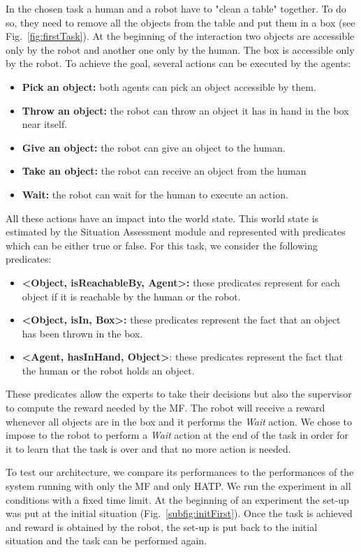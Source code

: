 \documentclass[english,a4paper,11pt,twoside]{StyleThese}
\begin{document}
In the chosen task a human and a robot have to "clean a table" together. To do so, they need to remove all the objects from the table and put them in a box (see Fig.~\ref{fig:firstTask}). At the beginning of the interaction two objects are accessible only by the robot and another one only by the human. The box is accessible only by the robot. To achieve the goal, several actions can be executed by the agents:
\begin{itemize}
\item \textbf{Pick an object:} both agents can pick an object accessible by them.
\item \textbf{Throw an object:} the robot can throw an object it has in hand in the box near itself. 
\item \textbf{Give an object:} the robot can give an object to the human.
\item \textbf{Take an object:} the robot can receive an object from the human
\item \textbf{Wait:} the robot can wait for the human to execute an action.
\end{itemize}
All these actions have an impact into the world state. This world state is estimated by the Situation Assessment module and represented with predicates which can be either true or false. For this task, we consider the following predicates:
\begin{itemize}
\item \textbf{<Object, isReachableBy, Agent>:} these predicates represent for each object if it is reachable by the human or the robot.
\item \textbf{<Object, isIn, Box>:} these predicates represent the fact that an object has been thrown in the box.
\item \textbf{<Agent, hasInHand, Object>}: these predicates represent the fact that the human or the robot holds an object.
\end{itemize}
These predicates allow the experts to take their decisions but also the supervisor to compute the reward needed by the MF. The robot will receive a reward whenever all objects are in the box and it performs the \textit{Wait} action. We chose to impose to the robot to perform a \textit{Wait} action at the end of the task in order for it to learn that the task is over and that no more action is needed.

To test our architecture, we compare its performances to the performances of the system running with only the MF and only HATP. We run the experiment in all conditions with a fixed time limit. At the beginning of an experiment the set-up was put at the initial situation (Fig.~\ref{subfig:initFirst}). Once the task is achieved and reward is obtained by the robot, the set-up is put back to the initial situation and the task can be performed again.
\end{document}
